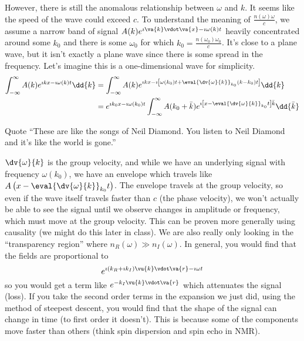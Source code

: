 \documentclass[a4paper,twoside,master.tex]{subfiles}
\begin{document}
However, there is still the anomalous relationship between $\omega$ and $ k $. It seems like the speed of the wave could exceed $ c $. To understand the meaning of $ \frac{n(\omega) \omega}{c} $, we assume a narrow band of signal $ A(k) e^{\imath \va{k} \vdot \va{x} - \imath \omega(k) t} $ heavily concentrated around some $ k_0 $ and there is some $ \omega_0 $ for which $ k_0 = \frac{n(\omega_0) \omega_0}{c} $. It's close to a plane wave, but it isn't exactly a plane wave since there is some spread in the frequency. Let's imagine this is a one-dimensional wave for simplicity.
\begin{align}
    \int_{- \infty}^{\infty} A(k) e^{\imath kx - \imath \omega(k) t} \dd{k} &= \int_{- \infty}^{\infty} A(k) e^{\imath kx - \imath \left[ \omega(k_0) t + \eval{\dv{\omega}{k}}_{k_0} (k - k_0)t \right]} \dd{k} \\
    &= e^{\imath k_0 x - \imath \omega(k_0) t} \int_{- \infty}^{\infty} A(k_0 + \bar{k}) e^{\imath \left[ x - \eval{\dv{\omega}{k}}_{k_0} t \right] \bar{k}} \dd{\bar{k}}
\end{align}
\begin{note}{Quote}
    ``These are like the songs of Neil Diamond. You listen to Neil Diamond and it's like the world is gone.''
\end{note}
$ \dv{\omega}{k} $ is the group velocity, and while we have an underlying signal with frequency $ \omega(k_0) $, we have an envelope which travels like $ A \left( x - \eval{\dv{\omega}{k}}_{k_0} t \right) $. The envelope travels at the group velocity, so even if the wave itself travels faster than $ c $ (the phase velocity), we won't actually be able to see the signal until we observe changes in amplitude or frequency, which must move at the group velocity. This can be proven more generally using causality (we might do this later in class). We are also really only looking in the ``transparency region'' where $ n_R(\omega) \gg n_I(\omega) $. In general, you would find that the fields are proportional to
\begin{equation}
    e^{\imath(k_R + \imath k_I) \vu{k} \vdot \va{r} - \imath \omega t}
\end{equation}
so you would get a term like $ e^{-k_I \vu{k} \vdot \va{r}} $ which attenuates the signal (loss). If you take the second order terms in the expansion we just did, using the method of steepest descent, you would find that the shape of the signal can change in time (to first order it doesn't). This is because some of the components move faster than others (think spin dispersion and spin echo in NMR).
\end{document}

